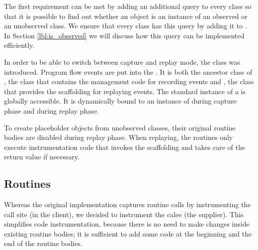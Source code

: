 The first requirement can be met by adding an additional query to every class so that it is possible to find out whether an object is an instance of an observed or an unobserved class. We ensure that every class has this query by adding it to . In Section \ref{lbl:is_observed} we will discuss how this query can be implemented efficiently.

In order to be able to switch between capture and replay mode, the class  was introduced. Program flow events are put into the . It is both the ancestor class of , the class that contains the management code for recording events and , the class that provides the scaffolding for replaying events. The standard instance of a  is globally accessible. It is dynamically bound to an instance of  during capture phase and  during replay phase.

To create placeholder objects from unobserved classes, their original routine bodies are disabled during replay phase. When replaying, the routines only execute instrumentation code that invokes the scaffolding and takes care of the return value if necessary.

\subsection{Routines}
Whereas the original implementation captures routine calls by instrumenting the call site (in the client), we decided to instrument the calee (the supplier). This simplifies code instrumentation, because there is no need to make changes inside existing routine bodies; it is sufficient to add some code at the beginning and the end of the routine bodies. %

